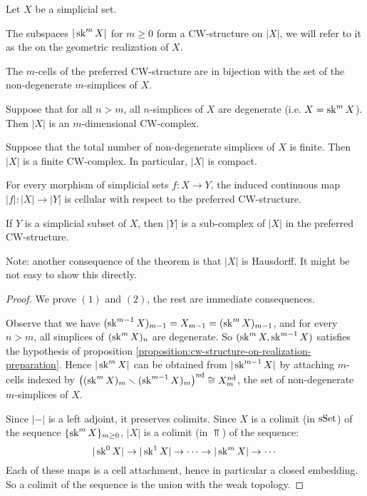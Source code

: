 \begin{theorem}\label{theorem:cw-structure-on-realization}
Let $X$ be a simplicial set.
\begin{numerate}
\item The subspaces $|\operatorname{sk}^m X|$ for $m\ge0$ form a CW-structure on $|X|$, we will refer to it as the  on the geometric realization of $X$.
\item The $m$-cells of the preferred CW-structure are in bijection with the set of the non-degenerate $m$-simplices of $X$.
\item Suppose that for all $n>m$, all $n$-simplices of $X$ are degenerate (i.e. $X=\operatorname{sk}^m X$). Then $|X|$ is an $m$-dimensional CW-complex.
\item Suppose that the total number of non-degenerate simplices of $X$ is finite. Then $|X|$ is a finite CW-complex. In particular, $|X|$ is compact.
\item For every morphism of simplicial sets $f:X\to Y$, the induced continuous map $|f|:|X|\to|Y|$ is cellular with respect to the preferred CW-structure.
\item If $Y$ is a simplicial subset of $X$, then $|Y|$ is a sub-complex of $|X|$ in the preferred CW-structure.
\end{numerate}
\end{theorem}

Note: another consequence of the theorem is that $|X|$ is Hausdorff. It might be not easy to show this directly.

\begin{proof}
We prove $(1)$ and $(2)$, the rest are immediate consequences.

Observe that we have $(\operatorname{sk}^{m-1} X)_{m-1}=X_{m-1}=(\operatorname{sk}^m X)_{m-1}$, and for every $n>m$, all simplices of $(\operatorname{sk}^m X)_n$ are degenerate. So $(\operatorname{sk}^m X,\operatorname{sk}^{m-1} X)$ satisfies the hypothesis of proposition \ref{proposition:cw-structure-on-realization-preparation}. Hence $|\operatorname{sk}^m X|$ can be obtained from $|\operatorname{sk}^{m-1} X|$ by attaching $m$-cells indexed by $\left((\operatorname{sk}^m X)_m\smallsetminus(\operatorname{sk}^{m-1} X)_m\right)^\text{nd} \cong X_m^{\text{nd}}$, the set of non-degenerate $m$-simplices of $X$.

Since $|-|$ is a left adjoint, it preserves colimits. Since $X$ is a colimit (in ${\mathrm{sSet}}$) of the sequence $\{\operatorname{sk}^m X\}_{m\ge0}$, $|X|$ is a colimit (in $\Top$) of the sequence:
\[|\operatorname{sk}^0 X|\to|\operatorname{sk}^1 X|\to\cdots\to|\operatorname{sk}^m X|\to\cdots\]
Each of these maps is a cell attachment, hence in particular a closed embedding. So a colimit
of the sequence is the union with the weak topology.
\end{proof}

